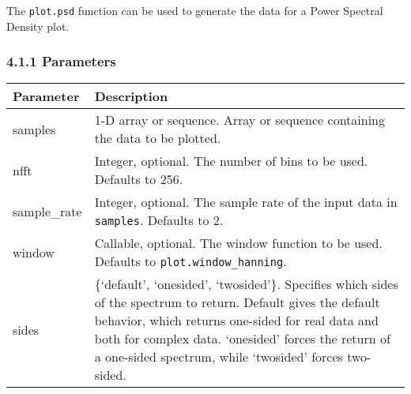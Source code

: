 \documentclass[]{article}
\begin{document}
The \texttt{plot.psd} function can be used to generate the data for a
Power Spectral Density plot.

\subsubsection{4.1.1 Parameters}\label{parameters-2}

\begin{longtable}[]{@{}ll@{}}
\toprule
\begin{minipage}[b]{0.15\columnwidth}\raggedright\strut
Parameter\strut
\end{minipage} & \begin{minipage}[b]{0.80\columnwidth}\raggedright\strut
Description\strut
\end{minipage}\tabularnewline
\midrule
\endhead
\begin{minipage}[t]{0.15\columnwidth}\raggedright\strut
samples\strut
\end{minipage} & \begin{minipage}[t]{0.80\columnwidth}\raggedright\strut
1-D array or sequence. Array or sequence containing the data to be
plotted.\strut
\end{minipage}\tabularnewline
\begin{minipage}[t]{0.15\columnwidth}\raggedright\strut
nfft\strut
\end{minipage} & \begin{minipage}[t]{0.80\columnwidth}\raggedright\strut
Integer, optional. The number of bins to be used. Defaults to 256.\strut
\end{minipage}\tabularnewline
\begin{minipage}[t]{0.15\columnwidth}\raggedright\strut
sample\_rate\strut
\end{minipage} & \begin{minipage}[t]{0.80\columnwidth}\raggedright\strut
Integer, optional. The sample rate of the input data in
\texttt{samples}. Defaults to 2.\strut
\end{minipage}\tabularnewline
\begin{minipage}[t]{0.15\columnwidth}\raggedright\strut
window\strut
\end{minipage} & \begin{minipage}[t]{0.80\columnwidth}\raggedright\strut
Callable, optional. The window function to be used. Defaults to
\texttt{plot.window\_hanning}.\strut
\end{minipage}\tabularnewline
\begin{minipage}[t]{0.15\columnwidth}\raggedright\strut
sides\strut
\end{minipage} & \begin{minipage}[t]{0.80\columnwidth}\raggedright\strut
\{`default', `onesided', `twosided'\}. Specifies which sides of the
spectrum to return. Default gives the default behavior, which returns
one-sided for real data and both for complex data. `onesided' forces the
return of a one-sided spectrum, while `twosided' forces two-sided.\strut
\end{minipage}\tabularnewline
\bottomrule
\end{longtable}
\end{document}
